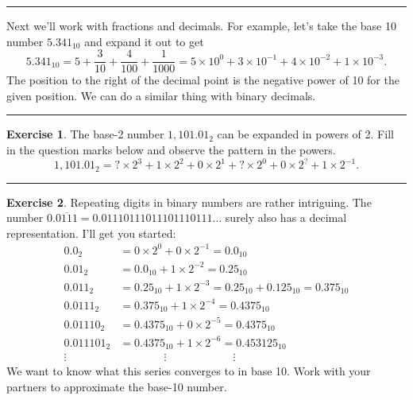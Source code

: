 \documentclass[
]{book}
\theoremstyle{definition}
\theoremstyle{definition}
\theoremstyle{definition}
\newtheorem{exercise}{Exercise}[chapter]
\theoremstyle{remark}
\begin{document}
\begin{center}\rule{0.5\linewidth}{0.5pt}\end{center}

Next we'll work with fractions and decimals. For example, let's take the
base 10 number \(5.341_{10}\) and expand it out to get
\[5.341_{10} = 5 + \frac{3}{10} + \frac{4}{100} + \frac{1}{1000} = 5 \times 10^0 + 3 \times
10^{-1} + 4 \times 10^{-2} + 1 \times 10^{-3}.\] The position to the
right of the decimal point is the negative power of 10 for the given
position. We can do a similar thing with binary decimals.

\begin{center}\rule{0.5\linewidth}{0.5pt}\end{center}

\begin{exercise}
\protect\hypertarget{exr:unnamed-chunk-14}{}{\label{exr:unnamed-chunk-14} }The base-2 number \(1,101.01_2\) can be expanded in powers of 2. Fill in
the question marks below and observe the pattern in the powers.
\[1,101.01_2 = ? \times 2^3 + 1 \times 2^2 + 0 \times 2^1 +
    ? \times 2^0 + 0 \times 2^{?} + 1 \times 2^{-1}.\]
\end{exercise}

\begin{center}\rule{0.5\linewidth}{0.5pt}\end{center}

\begin{exercise}
\protect\hypertarget{exr:unnamed-chunk-15}{}{\label{exr:unnamed-chunk-15} }Repeating digits in binary numbers are rather intriguing. The number
\(0.\overline{0111} = 0.01110111011101110111\ldots\) surely also has a
decimal representation. I'll get you started: \[\begin{aligned}
        0.0_2 &= 0 \times 2^0 + 0 \times 2^{-1} = 0.0_{10} \\
        0.01_2 &= 0.0_{10} + 1 \times 2^{-2} = 0.25_{10} \\
        0.011_2 &= 0.25_{10} + 1 \times 2^{-3} = 0.25_{10} + 0.125_{10} = 0.375_{10} \\
        0.0111_2 &= 0.375_{10} + 1 \times 2^{-4} = 0.4375_{10} \\
        0.01110_2 &= 0.4375_{10} + 0 \times 2^{-5} = 0.4375_{10} \\
        0.011101_2 &= 0.4375_{10} + 1 \times 2^{-6} = 0.453125_{10} \\
        \vdots & \qquad \qquad \vdots \qquad \qquad \qquad \vdots
    \end{aligned}\] We want to know what this series converges to in
base 10. Work with your partners to approximate the base-10 number.
\end{exercise}
\end{document}
